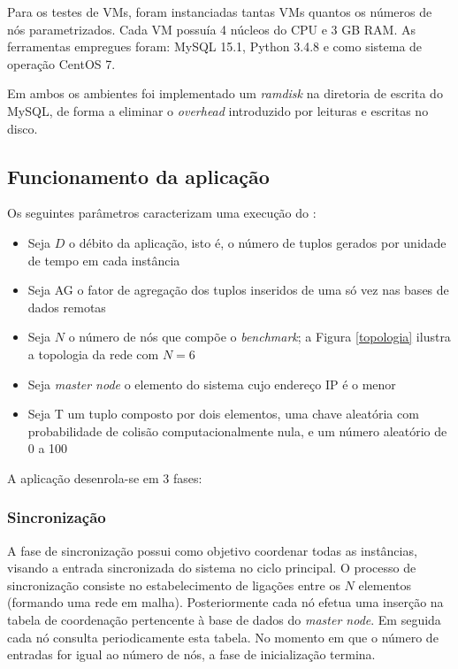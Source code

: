 Para os testes de VMs, foram instanciadas tantas VMs quantos os números de nós parametrizados. Cada VM possuía 4 núcleos do CPU e 3 GB RAM. As ferramentas empregues foram: MySQL 15.1, Python 3.4.8 e como sistema de operação CentOS 7.  

Em ambos os ambientes foi implementado um \textit{ramdisk} na diretoria de escrita do MySQL, de forma a eliminar o \textit{overhead} introduzido por leituras e escritas no disco.

\subsection{Funcionamento da aplicação} \label{func}

Os seguintes parâmetros caracterizam uma execução do \bench:

\begin{itemize}
\item Seja $D$ o débito da aplicação, isto é, o número de tuplos gerados por unidade de tempo em cada instância
\item Seja AG o fator de agregação dos tuplos inseridos de uma só vez nas bases de dados remotas
\item Seja $N$ o número de nós que compõe o \textit{benchmark}; a Figura \ref{topologia} ilustra a topologia da rede com $N=6$
\item Seja \textit{master node} o elemento do sistema cujo endereço IP é o menor
\item Seja T um tuplo composto por dois elementos, uma chave aleatória com probabilidade de colisão computacionalmente nula, e um número aleatório de 0 a 100
\end{itemize}

\noindent
A aplicação desenrola-se em 3 fases:

\subsubsection*{Sincronização}
A fase de sincronização possui como objetivo coordenar todas as instân\-cias, visando a entrada sincronizada do sistema no ciclo principal. O processo de sin\-cro\-ni\-za\-ção consiste no estabelecimento de ligações entre os $N$ elementos (formando uma rede em malha). Posteriormente cada nó efetua uma inserção na tabela de coordenação pertencente à base de dados do \textit{master node}.
Em seguida cada nó consulta periodicamente esta tabela. No momento em que o número de entradas for igual ao número de nós, a fase de inicialização termina.

